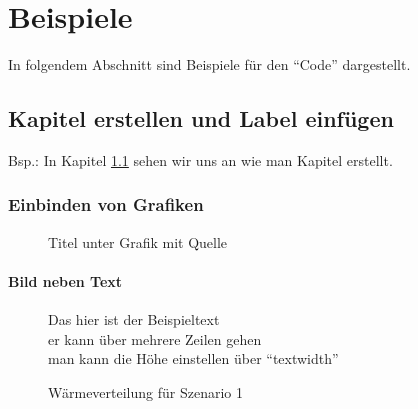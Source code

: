 \chapter{Beispiele}
In folgendem Abschnitt sind Beispiele für den \enquote{Code} dargestellt.\\

\section{Kapitel erstellen und Label einfügen}
	\label{sec:kapitel_erstellen} %

Bsp.: In Kapitel \ref{sec:kapitel_erstellen} sehen wir uns an wie man  Kapitel erstellt.

\subsection{Einbinden von Grafiken}
\begin{figure}[H]
	\centering
	\caption[Titel fürs Inhaltsverzeichnis]{Titel unter Grafik mit Quelle}
	\cite{agfw_leitfaden_wp}
	\label{fig:grafik1}
\end{figure}


\subsubsection{Bild neben Text}
\begin{figure}[H]
	\begin{minipage}[t]{0.49\textwidth}
		Das hier ist der Beispieltext \\
		er kann über mehrere Zeilen gehen\\
		man kann die Höhe einstellen über \enquote{textwidth}
	\end{minipage}
	\hfill%
	\begin{minipage}[t]{0.49\textwidth}%
		\vspace{-3mm}
		\caption{Wärmeverteilung für Szenario 1} %
		\label{fig:grafik2}
	\end{minipage}
\end{figure}


